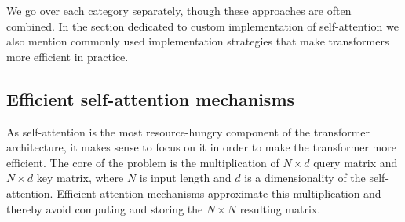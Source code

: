 We go over each category separately, though these approaches are often
combined. In the section dedicated to custom implementation of self-attention
we also mention commonly used implementation strategies that make transformers
more efficient in practice.

\subsection{Efficient self-attention mechanisms}











As self-attention is the most resource-hungry component of the transformer
architecture, it makes sense to focus on it in order to make the transformer
more efficient. The core of the problem is the multiplication of $N\times d$
query matrix and $N\times d$ key matrix, where $N$ is input length and $d$ is a
dimensionality of the self-attention. Efficient attention mechanisms approximate
this multiplication and thereby avoid computing and storing the $N\times N$
resulting matrix.

